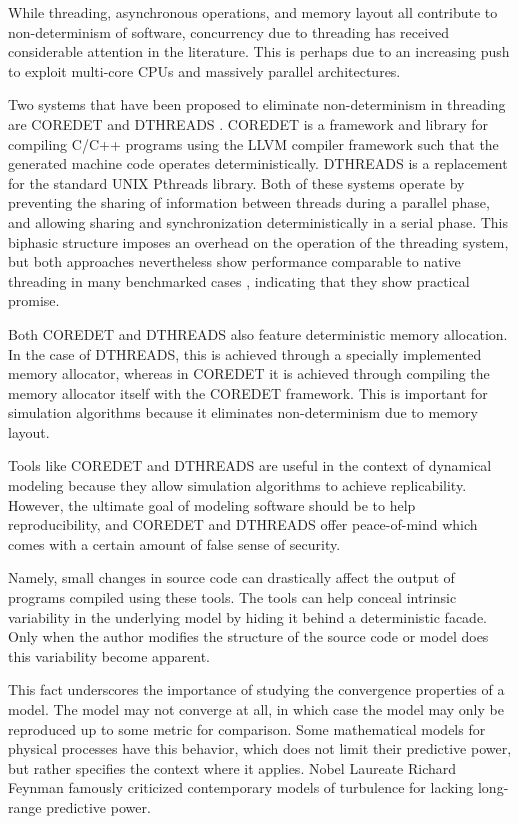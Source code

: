 \documentclass[journal,transmag,twoside]{IEEEtran}
\begin{document}
While threading, asynchronous operations, and memory layout all contribute
to non-determinism of software,
concurrency due to threading has received considerable attention in the literature.
This is perhaps due to an increasing push to exploit multi-core CPUs
and massively parallel architectures.

Two systems that have been proposed to eliminate non-determinism in threading
are C{\small ORE}D{\small ET} \cite{bergan2010coredet} and D{\small THREADS} \cite{liu2011dthreads}.
C{\small ORE}D{\small ET} is a framework and library for compiling C/C++ programs
using the LLVM \cite{lattner2004llvm} compiler framework such that the generated machine code operates deterministically.
D{\small THREADS} is a replacement for the standard UNIX Pthreads library.
Both of these systems operate by preventing the sharing of information between
threads during a parallel phase, and allowing sharing and synchronization
deterministically in a serial phase.
This biphasic structure imposes an overhead on the operation of the threading
system, but both approaches nevertheless show performance comparable to native
threading in many benchmarked cases \cite{liu2011dthreads}, indicating that they show
practical promise.

Both C{\small ORE}D{\small ET} and D{\small THREADS} also
feature deterministic memory allocation. In the case of D{\small THREADS},
this is achieved through a specially implemented memory allocator,
whereas in C{\small ORE}D{\small ET} it is achieved through compiling the
memory allocator itself with the C{\small ORE}D{\small ET} framework.
This is important for simulation algorithms because it eliminates non-determinism
due to memory layout.

Tools like C{\small ORE}D{\small ET} and D{\small THREADS} are useful in the context of
dynamical modeling because they allow simulation algorithms to achieve replicability.
However, the ultimate goal of modeling software should be to help reproducibility,
and C{\small ORE}D{\small ET} and D{\small THREADS} offer peace-of-mind which comes
with a certain amount of false sense of security.

Namely, small changes in source code can drastically affect the output of programs
compiled using these tools. The tools can help conceal intrinsic variability in the
underlying model by hiding it behind a deterministic facade.
Only when the author modifies the structure of the source code or model does this
variability become apparent.

This fact underscores the importance of studying the convergence properties of a model.
The model may not converge at all, in which case the model may only be reproduced up to
some metric for comparison. Some mathematical models for physical processes have this
behavior, which does not limit their predictive power, but rather specifies the context
where it applies.
Nobel Laureate Richard Feynman famously criticized contemporary models of turbulence
for lacking long-range predictive power.
\end{document}
